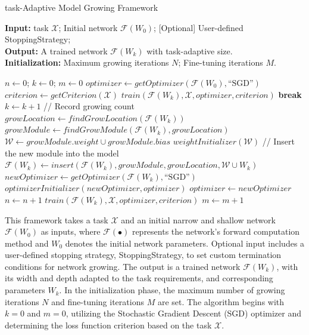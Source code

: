 \documentclass[preprint,12pt]{elsarticle}
\begin{document}
\begin{algorithm}[th!]
\caption{task-Adaptive Model Growing Framework}
\small
\label{alg:adaptive_model_growing}

\textbf{Input:} task $\mathcal{X}$; Initial network $\mathcal{F}(W_0)$; [Optional] User-defined StoppingStrategy; \\
\textbf{Output:} A trained network $\mathcal{F}(W_k)$ with task-adaptive size. \\
\textbf{Initialization:} Maximum growing iterations $N$; Fine-tuning iterations $M$.
\begin{algorithmic}[1]
\State $n \gets 0$; $k \gets 0$; $m \gets 0$
\State $optimizer \gets getOptimizer(\mathcal{F}(W_0), \text{``SGD''})$
\State $criterion \gets getCriterion(\mathcal{X})$
    \State $train(\mathcal{F}(W_k), \mathcal{X}, optimizer, criterion)$
        \State \textbf{break}
    \EndIf
        \State $k \gets k + 1$  // Record growing count
        \State $growLocation \gets findGrowLocation(\mathcal{F}(W_k))$
        \State $growModule \gets findGrowModule(\mathcal{F}(W_k), growLocation)$
        \State $\mathcal{W} \gets growModule.weight \cup growModule.bias$
        \State $weightInitializer(\mathcal{W})$
        \State // Insert the new module into the model
        \State $\mathcal{F}(W_k) \gets insert(\mathcal{F}(W_k), growModule, growLocation, \mathcal{W} \cup W_k)$
        \State $newOptimizer \gets getOptimizer(\mathcal{F}(W_k), \text{``SGD''})$
        \State $optimizerInitializer(newOptimizer, optimizer)$ 
        \State $optimizer \gets newOptimizer$
    \EndIf
    \State $n \gets n + 1$
\EndWhile
{}
    \State $train(\mathcal{F}(W_k), \mathcal{X}, optimizer, criterion)$
    \State $m \gets m + 1$
\EndWhile
\end{algorithmic}
\end{algorithm}

This framework takes a task $\mathcal{X}$ and an initial narrow and shallow network $\mathcal{F}(W_0)$ as inputs, where $\mathcal{F}(\bullet)$ represents the network's forward computation method and $W_0$ denotes the initial network parameters. Optional input includes a user-defined stopping strategy, StoppingStrategy, to set custom termination conditions for network growing. The output is a trained network $\mathcal{F}(W_k)$, with its width and depth adapted to the task requirements, and corresponding parameters $W_k$. In the initialization phase, the maximum number of growing iterations $N$ and fine-tuning iterations $M$ are set. The algorithm begins with $k=0$ and $m=0$, utilizing the Stochastic Gradient Descent (SGD) optimizer and determining the loss function criterion based on the task $\mathcal{X}$.
\end{document}
